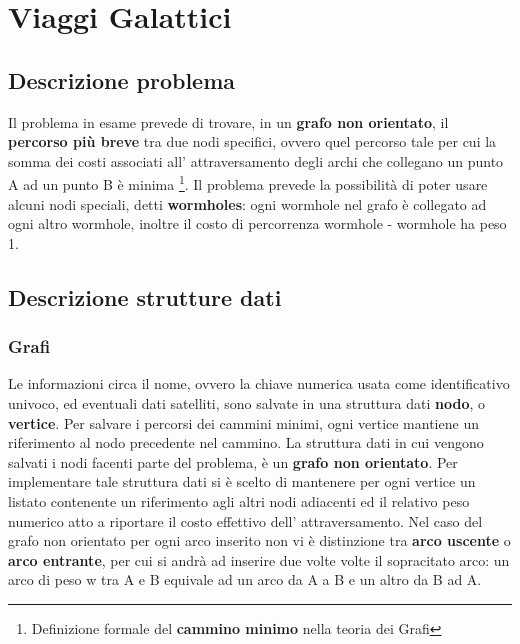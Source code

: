 \def\baselinestretch{1}
\chapter{ Viaggi Galattici }
\def\baselinestretch{1.66}
\thispagestyle{headings}
\section{Descrizione problema}

Il problema in esame prevede di trovare, in un \textbf{grafo
non orientato}, il \textbf{percorso pi\`u breve} tra due nodi
specifici, ovvero quel percorso tale per cui la somma dei
costi associati all' attraversamento degli archi che
collegano un punto A ad un punto B \`e minima \footnote{
Definizione formale del \textbf{cammino minimo} nella teoria
dei Grafi}. Il problema prevede la possibilit\`a
di poter usare alcuni nodi speciali, detti \textbf{wormholes}:
ogni wormhole nel grafo \`e collegato ad ogni altro wormhole,
inoltre il costo di percorrenza wormhole - wormhole ha peso 1.

\section{Descrizione strutture dati}

\subsection{Grafi}
Le informazioni circa il nome, ovvero la chiave numerica usata
come identificativo univoco, ed eventuali dati satelliti, sono
salvate in una struttura dati \textbf{nodo}, o \textbf{vertice}. Per salvare i percorsi dei cammini minimi, ogni vertice mantiene un riferimento al nodo precedente nel cammino.
La struttura dati in cui vengono salvati i nodi facenti parte
del problema, \`e un \textbf{grafo non orientato}. Per implementare
tale struttura dati si \`e scelto di mantenere per ogni
vertice un listato contenente un riferimento agli altri
nodi adiacenti ed il relativo peso numerico atto a riportare
il costo effettivo dell' attraversamento. Nel caso del grafo
non orientato per ogni arco inserito non vi \`e distinzione tra
\textbf{arco uscente} o \textbf{arco entrante}, per cui si andr\`a
ad inserire due volte volte il sopracitato arco: un arco di peso w
tra A e B equivale ad un arco da A a B e un altro da B ad A.

